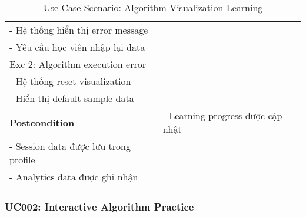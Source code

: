 \begin{table}[H]
\begin{tabular}{|p{3cm}|p{10cm}|}
- Hệ thống hiển thị error message \\
- Yêu cầu học viên nhập lại data \\
Exc 2: Algorithm execution error \\
- Hệ thống reset visualization \\
- Hiển thị default sample data \\
\hline
\textbf{Postcondition} & 
- Learning progress được cập nhật \\
- Session data được lưu trong profile \\
- Analytics data được ghi nhận \\
\hline
\end{tabular}
\caption{Use Case Scenario: Algorithm Visualization Learning}
\label{tab:uc001}
\end{table}

\subsubsection{UC002: Interactive Algorithm Practice}

